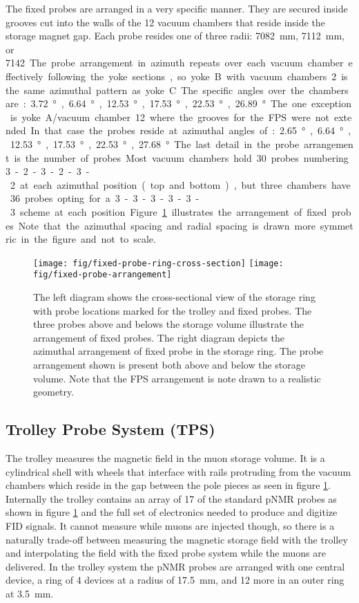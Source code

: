 The fixed probes are arranged in a very specific manner.  They are secured inside grooves cut into the walls of the 12 vacuum chambers that reside inside the storage magnet gap.  Each probe resides one of three radii: \SI{7082}{\mm}, \SI{7112}{\mm}, or \SI{7142}. The probe arrangement in azimuth repeats over each vacuum chamber effectively following the yoke sections, so yoke B with vacuum chambers 2 is the same azimuthal pattern as yoke C.  The specific angles over the chambers are: \SI{3.72}{\degree}, \SI{6.64}{\degree}, \SI{12.53}{\degree}, \SI{17.53}{\degree}, \SI{22.53}{\degree}, \SI{26.89}{\degree}.  The one exception is yoke A/vacuum chamber 12 where the grooves for the FPS were not extended.  In that case the probes reside at azimuthal angles of: \SI{2.65}{\degree}, \SI{6.64}{\degree}, \SI{12.53}{\degree}, \SI{17.53}{\degree}, \SI{22.53}{\degree}, \SI{27.68}{\degree}.  The last detail in the probe arrangement is the number of probes.  Most vacuum chambers hold 30 probes numbering 3-2-3-2-3-2 at each azimuthal position (top and bottom), but three chambers have 36 probes opting for a 3-3-3-3-3-3 scheme at each position.  Figure \ref{fig:fixed-probe-arrangement} illustrates the arrangement of fixed probes.  Note that the azimuthal spacing and radial spacing is drawn more symmetric in the figure and not to scale.

\begin{figure}
\centering
\texttt{[image: fig/fixed-probe-ring-cross-section]}
\texttt{[image: fig/fixed-probe-arrangement]}
\caption{
    The left diagram shows the cross-sectional view of the storage ring with probe locations marked for the trolley and fixed probes.  The three probes above and belows the storage volume illustrate the arrangement of fixed probes.  The right diagram depicts the azimuthal arrangement of fixed probe in the storage ring. The probe arrangement shown is present both above and below the storage volume. Note that the FPS arrangement is note drawn to a realistic geometry.
    \label{fig:fixed-probe-arrangement}
}
\end{figure}

\subsection{Trolley Probe System (TPS)}

The trolley measures the magnetic field in the muon storage volume.  It is a cylindrical shell with wheels that interface with rails protruding from the vacuum chambers which reside in the gap between the pole pieces as seen in figure \ref{fig:fixed-probe-arrangement}.  Internally the trolley contains an array of 17 of the standard pNMR probes as shown in figure \ref{fig:fixed-probe-arrangement} and the full set of electronics needed to produce and digitize FID signals.  It cannot measure while muons are injected though, so there is a naturally trade-off between measuring the magnetic storage field with the trolley and interpolating the field with the fixed probe system while the muons are delivered. In the trolley system the pNMR probes are arranged with one central device, a ring of 4 devices at a radius of \SI{17.5}{\mm}, and 12 more in an outer ring at \SI{3.5}{\mm}.

